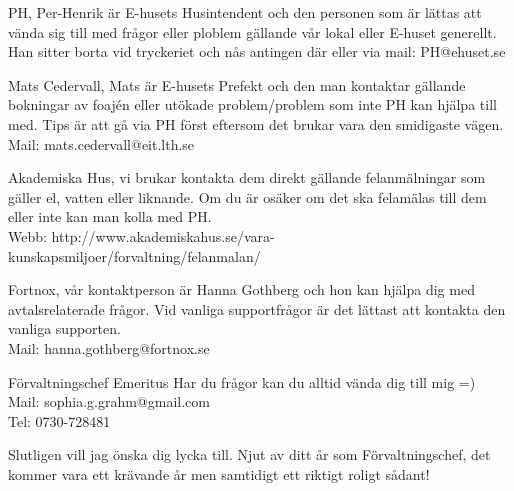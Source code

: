 \documentclass[10pt]{article}
\begin{document}
PH, Per-Henrik är E-husets Husintendent och den personen som är lättas att vända sig till
med frågor eller ploblem gällande vår lokal eller E-huset generellt.
\\Han sitter borta vid tryckeriet och nås antingen där eller via mail: PH@ehuset.se

Mats Cedervall, Mats är E-husets Prefekt och den man kontaktar gällande bokningar av foajén eller utökade problem/problem som inte PH kan hjälpa till med. Tips är att gå via PH först eftersom det brukar vara den smidigaste vägen.
\\Mail: mats.cedervall@eit.lth.se

Akademiska Hus, vi brukar kontakta dem direkt gällande felanmälningar som gäller el, vatten eller liknande. Om du är osäker om det ska felamälas till dem eller inte kan man kolla med PH.
\\Webb: http://www.akademiskahus.se/vara-kunskapsmiljoer/forvaltning/felanmalan/

Fortnox, vår kontaktperson är Hanna Gothberg och hon kan hjälpa dig med avtalsrelaterade frågor. Vid vanliga supportfrågor är det lättast att kontakta den vanliga supporten.
\\Mail: hanna.gothberg@fortnox.se

Förvaltningschef Emeritus
Har du frågor kan du alltid vända dig till mig =)
\\Mail: sophia.g.grahm@gmail.com
\\Tel: 0730-728481
\vfill

Slutligen vill jag önska dig lycka till. Njut av ditt år som Förvaltningschef, det kommer vara ett krävande år men samtidigt ett riktigt roligt sådant!
\end{document}

